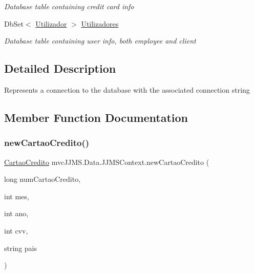 \begin{DoxyCompactItemize}
\begin{DoxyCompactList}\small\item\em Database table containing credit card info \end{DoxyCompactList}\item 
Db\+Set$<$ \mbox{\hyperlink{classmvc_j_j_m_s_1_1_models_1_1_utilizador}{Utilizador}} $>$ \mbox{\hyperlink{classmvc_j_j_m_s_1_1_data_1_1_j_j_m_s_context_a6c5c99292b7657f90a4b24d9da67e4ed}{Utilizadores}}
\begin{DoxyCompactList}\small\item\em Database table containing user info, both employee and client \end{DoxyCompactList}\end{DoxyCompactItemize}


\subsection{Detailed Description}
Represents a connection to the database with the associated connection string 



\subsection{Member Function Documentation}
\mbox{\label{classmvc_j_j_m_s_1_1_data_1_1_j_j_m_s_context_ae62a0d5dd75b07b98cc1d6f8e608b256}} 
\subsubsection{\texorpdfstring{new\+Cartao\+Credito()}{newCartaoCredito()}}
{\footnotesize\ttfamily \mbox{\hyperlink{classmvc_j_j_m_s_1_1_models_1_1_cartao_credito}{Cartao\+Credito}} mvc\+J\+J\+M\+S.\+Data.\+J\+J\+M\+S\+Context.\+new\+Cartao\+Credito (\begin{DoxyParamCaption}\item[{long}]{num\+Cartao\+Credito,  }\item[{int}]{mes,  }\item[{int}]{ano,  }\item[{int}]{cvv,  }\item[{string}]{pais }\end{DoxyParamCaption})\hspace{0.3cm}{\ttfamily [inline]}}



